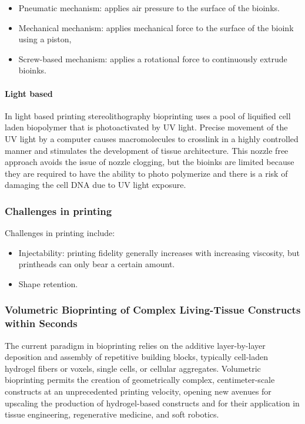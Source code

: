 			\begin{multicols}{2}
				\begin{itemize}
					\item Pneumatic mechanism: applies air pressure to the surface of the bioinks.
					\item Mechanical mechanism: applies mechanical force to the surface of the bioink using a piston,
					\item Screw-based mechanism: applies a rotational force to continuously extrude bioinks.
				\end{itemize}
			\end{multicols}

			\paragraph{Light based}
			In light based printing stereolithography bioprinting uses a pool of liquified cell laden biopolymer that is photoactivated by UV light.
			Precise movement of the UV light by a computer causes macromolecules to crosslink in a highly controlled manner and stimulates the development of tissue architecture.
			This nozzle free approach avoids the issue of nozzle clogging, but the bioinks are limited because they are required to have the ability to photo polymerize and there is a risk of damaging the cell DNA due to UV light exposure.

		\subsubsection{Challenges in printing}
		Challenges in printing include:

		\begin{multicols}{2}
			\begin{itemize}
				\item Injectability: printing fidelity generally increases with increasing viscosity, but printheads can only bear a certain amount.
				\item Shape retention.
			\end{itemize}
		\end{multicols}

		\subsubsection{Volumetric Bioprinting of Complex Living-Tissue Constructs within Seconds}
		The current paradigm in bioprinting relies on the additive layer-by-layer deposition and assembly of repetitive building blocks, typically cell-laden hydrogel fibers or voxels, single cells, or cellular aggregates.
		Volumetric bioprinting permits the creation of geometrically complex, centimeter-scale constructs at an unprecedented printing velocity, opening new avenues for upscaling the  production of hydrogel-based constructs and for their application in tissue engineering, regenerative medicine, and soft robotics.

